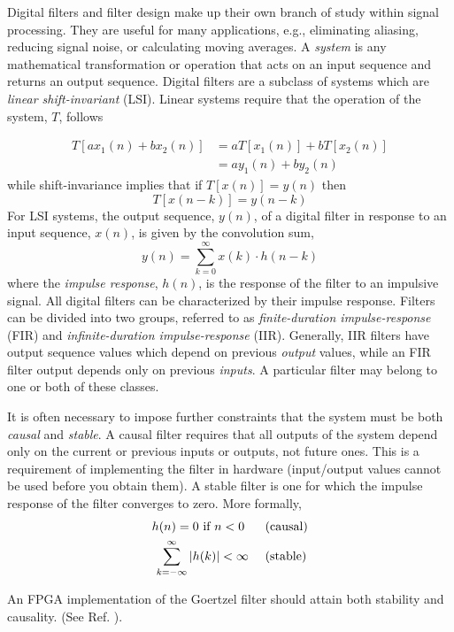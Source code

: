 \documentclass[reprint,amsmath,amssymb]{revtex4-2}
\begin{document}
Digital filters and filter design make up their own branch of study within signal processing. They are useful for many applications, e.g., eliminating aliasing, reducing signal noise, or calculating moving averages. A \textit{system} is any mathematical transformation or operation that acts on an input sequence and returns an output sequence. Digital filters are a subclass of systems which are \textit{linear shift-invariant} (LSI). Linear systems require that the operation of the system, $T$, follows

\begin{align*}
    T[a x_1(n) + b x_2(n)] & = a T[x_1(n)] + b T[x_2(n)] \\
    & = a y_1(n) + b y_2(n) 
\end{align*}
while shift-invariance implies that if $T[x(n)] = y(n)$ then
$$
T[x(n-k)] = y(n-k)
$$
For LSI systems, the output sequence, $y(n)$, of a digital filter in response to an input sequence, $x(n)$, is given by the convolution sum,
\begin{equation}
    y(n) = \sum_{k=0}^{\infty}x(k)\cdot h(n-k)
\end{equation}
where the \textit{impulse response}, $h(n)$, is the response of the filter to an impulsive signal. All digital filters can be characterized by their impulse response. Filters can be divided into two groups, referred to as \textit{finite-duration impulse-response} (FIR) and \textit{infinite-duration impulse-response} (IIR). Generally, IIR filters have output sequence values which depend on previous \textit{output} values, while an FIR filter output depends only on previous \textit{inputs}. A particular filter may belong to one or both of these classes.

It is often necessary to impose further constraints that the system must be both \textit{causal} and \textit{stable}. A causal filter requires that all outputs of the system depend only on the current or previous inputs or outputs, not future ones. This is a requirement of implementing the filter in hardware (input/output values cannot be used before you obtain them). A stable filter is one for which the impulse response of the filter converges to zero. More formally,
\begin{align*}
    h(n) = 0 \text{ if } n < 0 \ \ \ \ \ & \text{(causal)} \nonumber \\
   \sum_{k=-\infty}^\infty{\abs{h(k)}} < \infty \ \ \ \ & \text{(stable)} \nonumber
\end{align*}

An FPGA implementation of the Goertzel filter should attain both stability and causality. (See Ref. \cite{DSP}).
\end{document}
